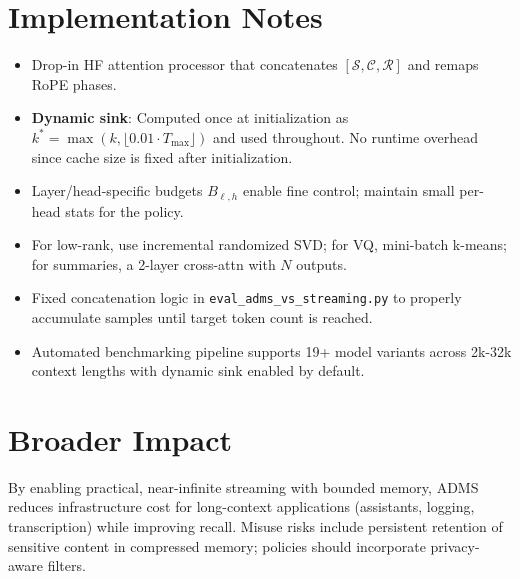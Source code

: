 \documentclass[11pt]{article}
\newcommand{\model}{\textsc{ADMS}} %
\newcommand{\sink}{\mathcal{S}}
\newcommand{\recent}{\mathcal{R}}
\newcommand{\compressed}{\mathcal{C}}
\begin{document}
\section{Implementation Notes}
\begin{itemize}
  \item Drop-in HF attention processor that concatenates $[\sink, \compressed, \recent]$ and remaps RoPE phases.
  \item \textbf{Dynamic sink}: Computed once at initialization as $k^* = \max(k, \lfloor 0.01 \cdot T_{\max}\rfloor)$ and used throughout. No runtime overhead since cache size is fixed after initialization.
  \item Layer/head-specific budgets $B_{\ell,h}$ enable fine control; maintain small per-head stats for the policy.
  \item For low-rank, use incremental randomized SVD; for VQ, mini-batch k-means; for summaries, a 2-layer cross-attn with $N$ outputs.
  \item Fixed concatenation logic in \texttt{eval\_adms\_vs\_streaming.py} to properly accumulate samples until target token count is reached.
  \item Automated benchmarking pipeline supports 19+ model variants across 2k-32k context lengths with dynamic sink enabled by default.
\end{itemize}

\section{Broader Impact}
By enabling practical, near-infinite streaming with bounded memory, \model{} reduces infrastructure cost for long-context applications (assistants, logging, transcription) while improving recall. Misuse risks include persistent retention of sensitive content in compressed memory; policies should incorporate privacy-aware filters.
\end{document}
